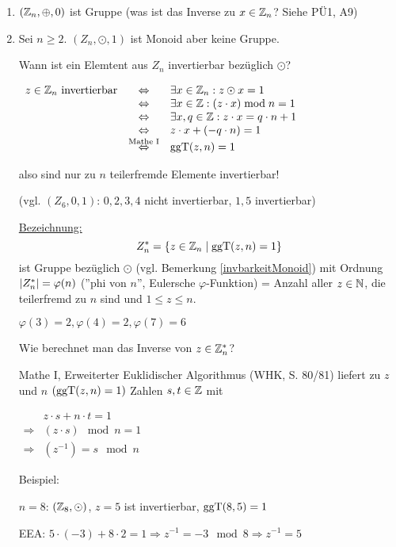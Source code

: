 \begin{enumerate}
	
	\item
	$(\mathbb{Z}_n, \oplus, 0)$ ist Gruppe (was ist das Inverse zu $x \in \mathbb{Z}_n$? Siehe PÜ1, A9)
	
	\item
	Sei $n \geq 2$. $(Z_n, \odot, 1)$ ist Monoid aber keine Gruppe. 
	
	Wann ist ein Elemtent aus $Z_n$ invertierbar bezüglich $\odot$?
	
	$\begin{array}{lcl}
	z \in \mathbb{Z}_n \text{ invertierbar} 
		&\Leftrightarrow&
		\exists x \in \mathbb{Z}_n : z \odot x = 1 \\
		&\Leftrightarrow&
		 \exists x \in \mathbb{Z}: (z \cdot x) \;\mathrm{mod}\;{n} = 1 \\
		&\Leftrightarrow&
		\exists x, q \in \mathbb{Z}: z \cdot x = q \cdot n + 1 \\
		&\Leftrightarrow&
		z \cdot x + (-q \cdot n) = 1 \\
		&\stackrel{\text{Mathe I}}{\Leftrightarrow}&
		\mathrm{ggT}(z, n) = 1 
	\end{array}$
	
	also sind nur zu $n$ teilerfremde Elemente invertierbar!
	
	(vgl. $(Z_6, 0, 1)$: $0, 2, 3, 4$ nicht invertierbar, $1, 5$ invertierbar)
	
	\underline{Bezeichnung:}
	\[Z_n^* = \left\{z \in \mathbb{Z}_n \;|\; \mathrm{ggT}(z, n) = 1\right\}\]
	ist Gruppe bezüglich $\odot$ (vgl. Bemerkung \ref{invbarkeitMonoid}) mit Ordnung $\left|Z_n^*\right|=\varphi(n)$ (''phi von $n$'', Eulersche $\varphi$-Funktion) = Anzahl aller $z \in \mathbb{N}$, die teilerfremd zu $n$ sind und $1 \leq z \leq n$.
	
	$\varphi(3) = 2, \varphi(4)=2, \varphi(7) = 6$

	Wie berechnet man das Inverse von $z \in \mathbb{Z}_n^*$?
	
	Mathe I, Erweiterter Euklidischer Algorithmus (WHK, S. 80/81) liefert zu $z$ und $n$ $(\mathrm{ggT}(z, n) = 1)$ Zahlen $s, t \in \mathbb{Z}$ mit 
	
	$\begin{array}{cl}
	& z \cdot s + n \cdot t = 1 \\
	\Rightarrow & (z \cdot s) \mod n = 1 \\
	\Rightarrow & (z^{-1}) = s \mod n
	\end{array}$
	
	Beispiel:
	
	$n=8$: $(\mathbb{Z}_8, \odot)$, $z=5$ ist invertierbar, $\mathrm{ggT}(8, 5) = 1$
	
	EEA: $5 \cdot (-3) + 8 \cdot 2 = 1 \Rightarrow z^{-1} = -3 \mod 8 \Rightarrow z^{-1} = 5$



\end{enumerate}
